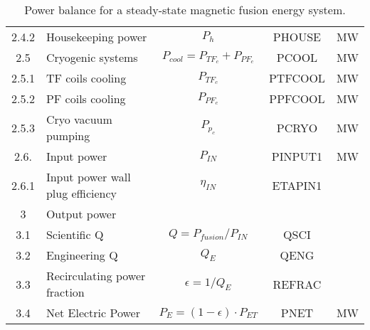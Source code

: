 \begin{table}[ht!]
\begin{tabular}{|c|p{5cm}|c|c|c|}
2.4.2	&	Housekeeping power	&	$P_{{h}}$	&	PHOUSE	&	MW \\
2.5	&	Cryogenic systems	&	$P_{{cool}} = P_{{TF}_c} + P_{{PF}_c}$	&	PCOOL	&	MW \\
2.5.1	&	TF coils cooling	&	$P_{{TF}_c}$	&	PTFCOOL	&	MW \\
2.5.2	&	PF coils cooling	&	$P_{{PF}_c}$	&	PPFCOOL	&	MW \\
2.5.3	&	Cryo vacuum pumping	&	$P_{{p}_c}$	&	PCRYO	&	MW \\
2.6.	& Input power 	& $P_{IN}$	&	PINPUT1	&	MW \\
2.6.1	& Input power wall plug efficiency  &	$\eta_{IN}$ & ETAPIN1	&	 \\
\hline								
3	&	Output power	&		&		&	\\
\hline
3.1	&	Scientific Q	&	$Q = P_{{fusion}}/P_{{IN}}$	&	QSCI	&	\\
3.2	&	Engineering Q	&	$Q_{{E}}$	&	QENG	&	\\
3.3	&	Recirculating power fraction	&	$\epsilon = 1/Q_{{E}}$	&	REFRAC	&	\\
3.4	&	Net Electric Power	&	$P_{{E}} = (1 - \epsilon) \cdot P_{{ET}}$	&	PNET	&	MW \\
\hline								
\end{tabular}	
\caption{Power balance for a steady-state magnetic fusion energy system.}
\label{tab:powerbalance}
\end{table}





